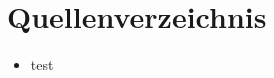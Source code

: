 \documentclass[a4paper,12pt]{scrartcl}
\begin{document}
\newpage

\section{Quellenverzeichnis}

\begin{itemize}
\item test
\end{itemize}
\end{document}
